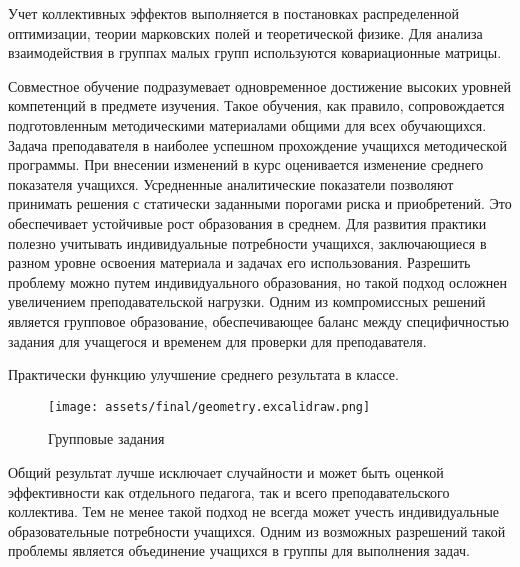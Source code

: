 \documentclass{article}
\begin{document}
Учет коллективных эффектов
выполняется в постановках распределенной оптимизации, теории марковских полей и теоретической физике. Для анализа взаимодействия в группах малых групп используются 
ковариационные матрицы. 


Совместное обучение подразумевает одновременное достижение высоких уровней компетенций в предмете изучения.
Такое обучения, как правило, сопровождается подготовленным методическими материалами общими для всех обучающихся.
Задача преподавателя в наиболее успешном прохождение учащихся методической программы. При внесении изменений
в курс оценивается изменение среднего показателя учащихся. Усредненные аналитические показатели позволяют принимать решения с статически заданными
порогами риска и приобретений. Это обеспечивает устойчивые рост образования в среднем. Для развития практики
полезно учитывать индивидуальные потребности учащихся, заключающиеся в разном уровне освоения материала и задачах его использования. Разрешить проблему
можно путем индивидуального образования, но такой подход осложнен увеличением преподавательской нагрузки. Одним из компромиссных решений является групповое образование,
обеспечивающее баланс между специфичностью задания для учащегося и временем для проверки для преподавателя.



Практически функцию улучшение среднего результата в классе. 


\begin{figure}[h]
    \centering
    \texttt{[image: assets/final/geometry.excalidraw.png]}
    \caption{Групповые задания}
    \label{group_task}
\end{figure}


Общий результат лучше исключает
случайности и может быть оценкой эффективности как отдельного педагога, так и всего преподавательского коллектива.
Тем не менее такой подход не всегда может учесть индивидуальные образовательные потребности учащихся. Одним из возможных
разрешений такой проблемы является объединение учащихся в группы для выполнения задач.
\end{document}
